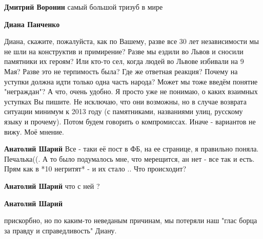 \begin{itemize}
\begin{itemize}
\textbf{Дмитрий Воронин} самый большой тризуб в мире

 
\textbf{Диана Панченко} 

Диана, скажите, пожалуйста, как по Вашему, разве все 30
лет независимости мы не шли на конструктив и примирение? Разве мы ездили во
Львов и сносили памятники их героям? Или кто-то сел, когда людей во Львове
избивали на 9 Мая? Разве это не терпимость была? Где же ответная реакция?
Почему на уступки должна идти только одна часть народа? Может мы тоже введём
понятие "неграждан"? А что, очень удобно. Я просто уже не понимаю, о каких
взаимных уступках Вы пишите. Не исключаю, что они возможны, но в случае
возврата ситуации минимум к 2013 году (с памятниками, названиями улиц, русскому
языку и прочему). Потом будем говорить о компромиссах. Иначе - вариантов не
вижу. Моё мнение.

 
\textbf{Анатолий Шарий} Все - таки её пост в ФБ, на ее странице, я правильно
поняла. Печалька((. А то было подумалось мне, что мерещится, ан нет - все так и
есть. Прям как в *10 негритят* - и их стало .. Что происходит?

 
\textbf{Анатолий Шарий} что с ней ?

 
\textbf{Анатолий Шарий} 

прискорбно, но по каким-то неведаным причинам, мы потеряли наш "глас борца за
правду и справедливость" Диану.


\end{itemize}
\end{itemize}
